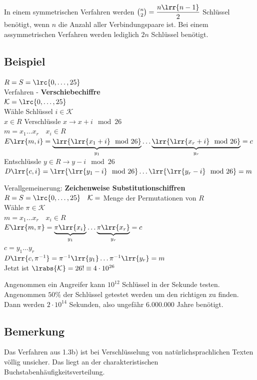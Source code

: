 		In einem symmetrischen Verfahren werden $\binom{n}{2}=\dfrac{n\lrr{n-1}}{2}$ Schlüssel benötigt, wenn $n$ die Anzahl aller Verbindungspaare ist. Bei einem assymmetrischen Verfahren werden lediglich $2n$ Schlüssel benötigt.
	\subsection{Beispiel}
			\item $R=S=\lrc{0,\dots,25}$ \\
				Verfahren - \textbf{Verschiebechiffre}\\
				$\mathcal{K}=\lrc{0,\dots,25}$ \\
				Wähle Schlüssel $i\in\mathcal{K}$\\
				$x\in R$ Verschlüssle $x\rightarrow x+i\mod 26$\\
				$m=x_1\dots x_r\quad x_i\in R$\\
				$E\lrr{m,i}=\underbrace{\lrr{\lrr{x_1+i}\mod 26}}_{y_1}\dots\underbrace{\lrr{\lrr{x_r+i}\mod 26}}_{y_r}=c$\\
				Entschlüssle $y\in R \rightarrow y-i\mod 26$\\
				$D\lrr{c,i}=\lrr{\lrr{y_1-i}\mod 26}\dots\lrr{\lrr{y_r-i}\mod 26}=m$
			\item Verallgemeinerung: \textbf{Zeichenweise Substitutionschiffren}\\
				$R=S=\lrc{0,\dots,25} \quad\mathcal{K}=$ Menge der Permutationen von $R$\\
				Wähle $\pi\in\mathcal{K}$\\
				$m=x_1\dots x_r\quad x_i\in R$\\
				$E\lrr{m,\pi}=\underbrace{\pi\lrr{x_i}}_{y_1}\dots\underbrace{\pi\lrr{x_r}}_{y_r}=c$\\
				$c=y_1\dots y_r$\\
				$D\lrr{c,\pi^{-1}}=\pi^{-1}\lrr{y_1}\dots\pi^{-1}\lrr{y_r}=m$\\
				Jetzt ist $\lrabs{\mathcal{K}}=26!\equiv 4\cdot10^{26}$
			
				Angenommen ein Angreifer kann $10^{12}$ Schlüssel in der Sekunde testen.\\
				Angenommen $50\%$ der Schlüssel getestet werden um den richtigen zu finden.\\
				Dann werden $2\cdot 10^{14}$ Sekunden, also ungefähr $6.000.000$ Jahre benötigt.
		\subExEnd
	\subsection{Bemerkung}
		Das Verfahren aus 1.3b) ist bei Verschlüsselung von natürlichsprachlichen Texten völlig unsicher. Das liegt an der charakteristischen Buchstabenhäufigkeitsverteilung.
